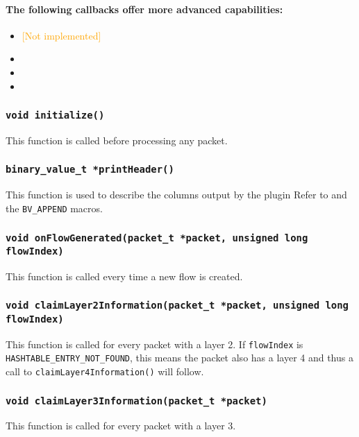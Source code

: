 \documentclass[documentation]{subfiles}
\begin{document}
\paragraph{The following callbacks offer more advanced capabilities:}
\begin{itemize}
    \item {\tt{}} \textcolor{orange}{[Not implemented]}
    \item {\tt{}}
    \item {\tt{}}
    \item {\tt{}}
\end{itemize}


\subsubsection{\tt void initialize()}\label{t2cb-initialize}
This function is called before processing any packet.

\subsubsection{\tt binary\_value\_t *printHeader()}\label{t2cb-printHeader}
This function is used to describe the columns output by the plugin
Refer to  and the {\tt BV\_APPEND} macros.

\subsubsection{\tt void onFlowGenerated(packet\_t *packet, unsigned long flowIndex)}\label{t2cb-onFlowGenerated}
This function is called every time a new flow is created.

\subsubsection{\tt void claimLayer2Information(packet\_t *packet, unsigned long flowIndex)}\label{t2cb-claimLayer2Information}
This function is called for every packet with a layer 2.
If {\tt flowIndex} is {\tt HASHTABLE\_ENTRY\_NOT\_FOUND}, this means the packet also has
a layer 4 and thus a call to {\tt claimLayer4Information()} will follow.

\subsubsection{\tt void claimLayer3Information(packet\_t *packet)}\label{t2cb-claimLayer3Information}
This function is called for every packet with a layer 3.
\end{document}

